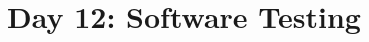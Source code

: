 \documentclass{article}
\begin{document}
\title{Day 12: Software Testing}
\author{}
\date{}
\maketitle


\end{document}
